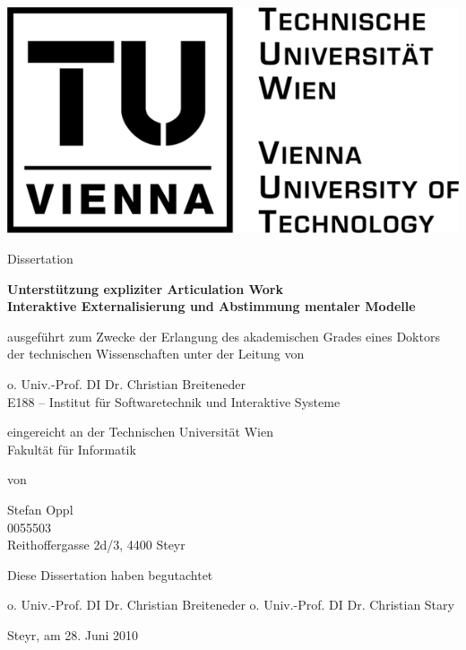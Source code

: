 \begin{titlepage}
	{
	\centering

	\includegraphics[width=.25\textwidth]{img/tu_logo.png}

	\vspace{1cm}

	\Large Dissertation
	
	\vspace{0.5cm}
	
	\textsf{
	\Large \textbf{Unterstützung expliziter Articulation Work}\\	
	\large \textbf{Interaktive Externalisierung und Abstimmung mentaler Modelle}
	}

	\vspace{1cm}
	
	\normalsize ausgeführt zum Zwecke der Erlangung des akademischen Grades eines Doktors der technischen Wissenschaften unter der Leitung von

	\vspace{0.3cm}

	o. Univ.-Prof. DI Dr. Christian Breiteneder\\\normalsize E188 -- Institut für Softwaretechnik und Interaktive Systeme

	\vspace{0.5cm}

	eingereicht an der Technischen Universität Wien\\Fakultät für Informatik

	\vspace{0.8cm}

	von

	\vspace{0.3cm}

	Stefan Oppl\\\normalsize 0055503\\Reithoffergasse 2d/3, 4400 Steyr
	
	\vspace{1cm}
	
	Diese Dissertation haben begutachtet
	
	\vspace{1.5cm}
	\small o. Univ.-Prof. DI Dr. Christian Breiteneder \hspace{1cm} o. Univ.-Prof. DI Dr. Christian Stary

	\vspace{1.8cm}
	}
	\normalsize Steyr, am 28. Juni 2010
	
\end{titlepage}